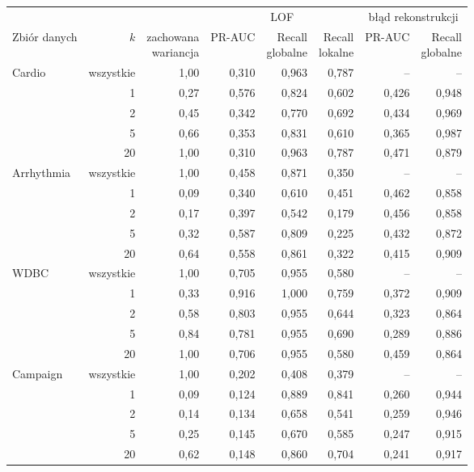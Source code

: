 \begin{tabular}{lrrrrrrr}
\toprule
 & & & \multicolumn{3}{c}{LOF} & \multicolumn{2}{c}{błąd rekonstrukcji} \\
\cmidrule(lr){4-6}\cmidrule(lr){7-8}
Zbiór danych & $k$ & \makecell[r]{zachowana\\wariancja} & PR-AUC & \makecell[r]{Recall\\globalne} & \makecell[r]{Recall\\lokalne} & PR-AUC & \makecell[r]{Recall\\globalne} \\
\midrule
Cardio & wszystkie & 1,00 & 0,310 & 0,963 & 0,787 & -- & -- \\
 & 1 & 0,27 & 0,576 & 0,824 & 0,602 & 0,426 & 0,948 \\
 & 2 & 0,45 & 0,342 & 0,770 & 0,692 & 0,434 & 0,969 \\
 & 5 & 0,66 & 0,353 & 0,831 & 0,610 & 0,365 & 0,987 \\
 & 20 & 1,00 & 0,310 & 0,963 & 0,787 & 0,471 & 0,879 \\
\midrule
Arrhythmia & wszystkie & 1,00 & 0,458 & 0,871 & 0,350 & -- & -- \\
 & 1 & 0,09 & 0,340 & 0,610 & 0,451 & 0,462 & 0,858 \\
 & 2 & 0,17 & 0,397 & 0,542 & 0,179 & 0,456 & 0,858 \\
 & 5 & 0,32 & 0,587 & 0,809 & 0,225 & 0,432 & 0,872 \\
 & 20 & 0,64 & 0,558 & 0,861 & 0,322 & 0,415 & 0,909 \\
\midrule
WDBC & wszystkie & 1,00 & 0,705 & 0,955 & 0,580 & -- & -- \\
 & 1 & 0,33 & 0,916 & 1,000 & 0,759 & 0,372 & 0,909 \\
 & 2 & 0,58 & 0,803 & 0,955 & 0,644 & 0,323 & 0,864 \\
 & 5 & 0,84 & 0,781 & 0,955 & 0,690 & 0,289 & 0,886 \\
 & 20 & 1,00 & 0,706 & 0,955 & 0,580 & 0,459 & 0,864 \\
\midrule
Campaign & wszystkie & 1,00 & 0,202 & 0,408 & 0,379 & -- & -- \\
 & 1 & 0,09 & 0,124 & 0,889 & 0,841 & 0,260 & 0,944 \\
 & 2 & 0,14 & 0,134 & 0,658 & 0,541 & 0,259 & 0,946 \\
 & 5 & 0,25 & 0,145 & 0,670 & 0,585 & 0,247 & 0,915 \\
 & 20 & 0,62 & 0,148 & 0,860 & 0,704 & 0,241 & 0,917 \\
\bottomrule
\end{tabular}
